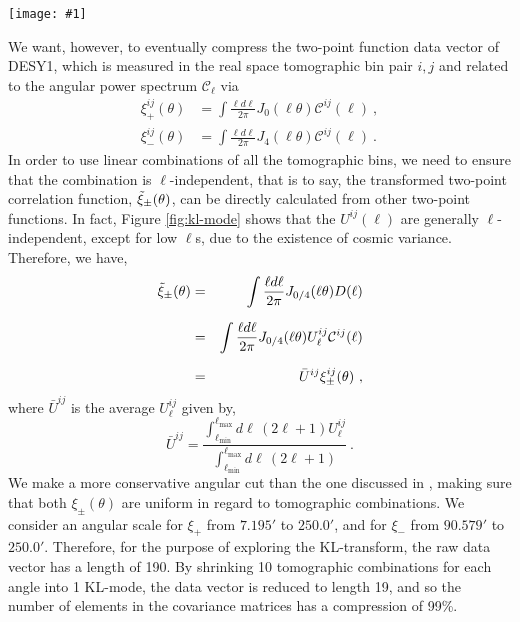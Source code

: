 \documentclass[twocolumn,nofootinbib]{\docclass}
\newcommand{\sfig}[2]{
	\texttt{[image: \#1]}
}
\newcommand{\rf}[1]{Figure \ref{fig:#1}}
\newcommand\be{\begin{equation}}
\newcommand\ee{\end{equation}}
\newcommand\bea{\begin{eqnarray}}
\newcommand\eea{\end{eqnarray}}
\newcommand\ctot{\mathcal{C}}
\begin{document}
\begin{figure*}[thbp]
	\sfig{kl-mode.pdf}{0.8\textwidth}
	\caption{\textbf{Left:} Column vectors of the matrix $R_{\ell}$, or $e^p_{\ell} N^{-\frac{1}{2}}$, for compressing the shear power spectrum $\ctot_{\ell}$.
		\textbf{Right:} Transformation on tomographic bin combination $U_{ij}$ constructed from the KL-eigenmodes. For both plots, the dashed black lines are the weighted average of each mode. The lightest shade represents $\ell = 10$ and the increment is $\Delta \ell = 10$ for each darker shade.}
	\label{fig:kl-mode}
\end{figure*}

We want, however, to eventually compress the two-point function data vector of DESY1, which is measured in the real space tomographic bin pair ${i, j}$ and related to the angular power spectrum $\ctot_{\ell}$ via
\be
\begin{split}
	\xi_{+}^{ij}(\theta) &= \int \frac{\ell d \ell }{2\pi}J_{0}(\ell \theta) \ctot^{ij}(\ell)\ , \\[2ex]
	\xi_{-}^{ij}(\theta) &= \int \frac{\ell d \ell }{2\pi}J_{4}(\ell \theta) \ctot^{ij}(\ell)\ 
	.\end{split}
\ee
In order to use linear combinations of all the tomographic bins, we need to ensure that the combination is $\ell$-independent, that is to say, the transformed two-point correlation function, $\Tilde{\xi}_{\pm}(\theta)$, can be directly calculated from other two-point functions. In fact, \rf{kl-mode} shows that the $U^{ij}(\ell)$ are generally $\ell$-independent, except for low $\ell$s, due to the existence of cosmic variance. Therefore, we have,
\bea
\nonumber \Tilde{\xi}_{\pm}(\theta) &=& \int \frac{\ell d \ell }{2\pi}J_{0/4}(\ell \theta) D(\ell)\\[1.5ex]
\nonumber &=&\int \frac{\ell d \ell }{2\pi}J_{0/4}(\ell \theta) U^{ij}_\ell \ctot^{ij}(\ell)\\[1.5ex]
&=&\bar{U}^{ij}\xi_{\pm}^{ij}(\theta)\
,\eea
where $\bar{U}^{ij}$ is the average $U^{ij}_{\ell}$ given by,
\be
\bar{U}^{ij} = \frac{\int_{\ell _{\text{min}}}^{\ell _{\text{max}}} d\ell\, (2 \ell +1) U^{ij}_{\ell}}{\int_{\ell _{\text{min}}}^{\ell _{\text{max}}} d\ell\, (2 \ell +1)}\
.\ee
We make a more conservative angular cut than the one discussed in \cite{Troxel:2017xyo}, making sure that both $\xi_{\pm}(\theta)$ are uniform in regard to tomographic combinations. We consider an angular scale for  $\xi_+$ from $7.195'$ to $250.0'$, and for $\xi_-$ from $90.579'$ to $250.0'$. Therefore, for the purpose of exploring the KL-transform, the raw data vector has a length of 190. By shrinking 10 tomographic combinations for each angle into 1 KL-mode, the data vector is reduced to length 19, and so the number of elements in the covariance matrices has a compression of 99\%.
\end{document}
